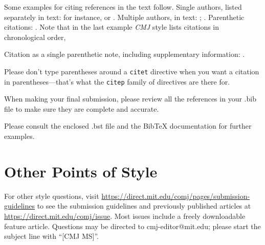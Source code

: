\documentclass[letterpaper, 12pt]{article}
\begin{document}
Some examples for citing references in the text follow.
Single authors, listed separately in text: for instance, \citet{Ano08} or \citet{Bele68}.
Multiple authors, in text: \citet{VeRo00}; \citet{AtDa04}.
Parenthetic citations: \citep{Ther99, AtDa04, test4authors}.
Note that in the last example \emph{CMJ} style lists citations in chronological order, 

Citation as a single parenthetic note, including supplementary information: \citep[see also][which includes detailed diagrams]{Zica02}.

Please don't type parentheses around a \texttt{citet{}} directive when you want a citation in parentheses---that's what the \texttt{citep{}} family of directives are there for.

When making your final submission, please review all the references in your .bib file to make sure they are complete and accurate. 

Please consult the enclosed .bst file and the BibTeX documentation for further examples. 

\section{Other Points of Style}

For other style questions, visit \url{https://direct.mit.edu/comj/pages/submission-guidelines} to see the submission guidelines and previously published articles at \url{https://direct.mit.edu/comj/issue}.  
Most issues include a freely downloadable feature article.  
Questions may be directed to cmj-editor@mit.edu; please start the subject line with ``[CMJ MS]''.




\end{document}
